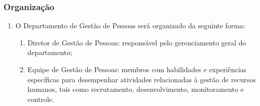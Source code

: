 {        \subsubsection{Organização}
        \begin{enumerate}
            \item O Departamento de Gestão de Pessoas será organizado da seguinte forma:
                \begin{enumerate}
                    \item Diretor de Gestão de Pessoas: responsável pelo gerenciamento geral do departamento;
                    \item Equipe de Gestão de Pessoas: membros com habilidades e experiências específicas para desempenhar atividades relacionadas à gestão de recursos humanos, tais como recrutamento, desenvolvimento, monitoramento e controle.
                \end{enumerate}
        \end{enumerate}
}
